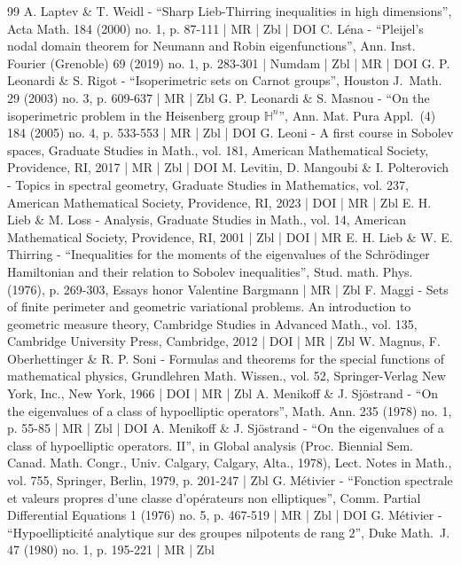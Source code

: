 \begin{thebibliography}{99}
A. Laptev \& T. Weidl - “Sharp Lieb-Thirring inequalities in high dimensions”, Acta Math. 184 (2000) no. 1, p. 87-111 | MR | Zbl | DOI
C. Léna - “Pleijel’s nodal domain theorem for Neumann and Robin eigenfunctions”, Ann. Inst. Fourier (Grenoble) 69 (2019) no. 1, p. 283-301 | Numdam | Zbl | MR | DOI
G. P. Leonardi \& S. Rigot - “Isoperimetric sets on Carnot groups”, Houston J. Math. 29 (2003) no. 3, p. 609-637 | MR | Zbl
G. P. Leonardi \& S. Masnou - “On the isoperimetric problem in the Heisenberg group ${\mathbb{H}}^n$”, Ann. Mat. Pura Appl. (4) 184 (2005) no. 4, p. 533-553 | MR | Zbl | DOI
G. Leoni - A first course in Sobolev spaces, Graduate Studies in Math., vol. 181, American Mathematical Society, Providence, RI, 2017 | MR | Zbl | DOI
M. Levitin, D. Mangoubi \& I. Polterovich - Topics in spectral geometry, Graduate Studies in Mathematics, vol. 237, American Mathematical Society, Providence, RI, 2023 | DOI | MR | Zbl
E. H. Lieb \& M. Loss - Analysis, Graduate Studies in Math., vol. 14, American Mathematical Society, Providence, RI, 2001 | Zbl | DOI | MR
E. H. Lieb \& W. E. Thirring - “Inequalities for the moments of the eigenvalues of the Schrödinger Hamiltonian and their relation to Sobolev inequalities”, Stud. math. Phys. (1976), p. 269-303, Essays honor Valentine Bargmann | MR | Zbl
F. Maggi - Sets of finite perimeter and geometric variational problems. An introduction to geometric measure theory, Cambridge Studies in Advanced Math., vol. 135, Cambridge University Press, Cambridge, 2012 | DOI | MR | Zbl
W. Magnus, F. Oberhettinger \& R. P. Soni - Formulas and theorems for the special functions of mathematical physics, Grundlehren Math. Wissen., vol. 52, Springer-Verlag New York, Inc., New York, 1966 | DOI | MR | Zbl
A. Menikoff \& J. Sjöstrand - “On the eigenvalues of a class of hypoelliptic operators”, Math. Ann. 235 (1978) no. 1, p. 55-85 | MR | Zbl | DOI
A. Menikoff \& J. Sjöstrand - “On the eigenvalues of a class of hypoelliptic operators. II”, in Global analysis (Proc. Biennial Sem. Canad. Math. Congr., Univ. Calgary, Calgary, Alta., 1978), Lect. Notes in Math., vol. 755, Springer, Berlin, 1979, p. 201-247 | Zbl
G. Métivier - “Fonction spectrale et valeurs propres d’une classe d’opérateurs non elliptiques”, Comm. Partial Differential Equations 1 (1976) no. 5, p. 467-519 | MR | Zbl | DOI
G. Métivier - “Hypoellipticité analytique sur des groupes nilpotents de rang $2$”, Duke Math. J. 47 (1980) no. 1, p. 195-221 | MR | Zbl

\end{thebibliography}
